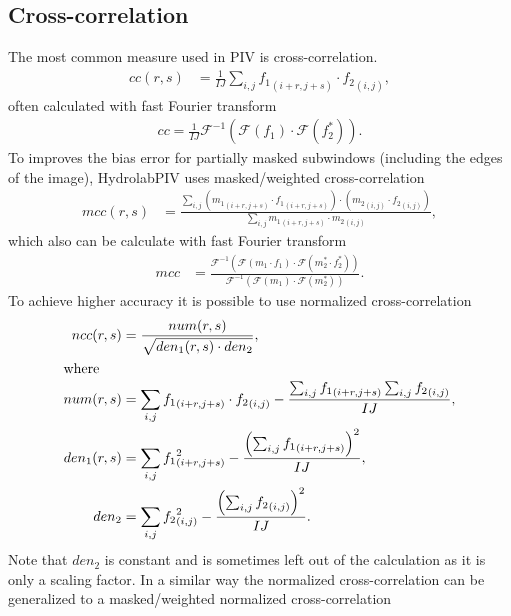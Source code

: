 \documentclass[10pt]{article}
\newcommand{\FT}{\ensuremath{\mathcal F}}
\newcommand{\iFT}{\ensuremath{\mathcal F^{-1}}}
\begin{document}
 \subsection{Cross-correlation}
 The most common measure used in PIV is cross-correlation.
   \begin{align*}	 
	 cc(r,s) &= \frac{1}{IJ}\sum_{i,j} {f_1}_{(i+r,j+s)}\cdot {f_2}_{(i,j)},
  \end{align*}
  often calculated with fast Fourier transform  
  \begin{align*}	 
	 cc = \frac{1}{IJ}\iFT\left(\FT(f_1)\cdot\FT(f_2^*)\right).
  \end{align*}    
  To improves the bias error for partially masked subwindows (including the edges of the image),
  HydrolabPIV uses masked/weighted cross-correlation  
  \begin{align*} 
	 mcc(r,s) &= \frac{\sum_{i,j} \left({m_1}_{(i+r,j+s)}\cdot {f_1}_{(i+r,j+s)}\right)
	                         \cdot\left({m_2}_{(i,j)}\cdot {f_2}_{(i,j)}\right)}
	                         {\sum_{i,j} {m_1}_{(i+r,j+s)}\cdot {m_2}_{(i,j)}},
  \end{align*}
  which also can be calculate with fast Fourier transform 
  \begin{align*} 
	 mcc &= \frac{\iFT\left(\FT(m_1\cdot f_1)\cdot\FT(m_2^*\cdot f_2^*)\right)}{\iFT\left(\FT(m_1)\cdot\FT(m_2^*)\right)}.
  \end{align*}  
To achieve higher accuracy it is possible to use normalized cross-correlation
\begin{align*}
  ncc(r,s) &= \frac{num(r,s)}{\sqrt{den_1(r,s)\cdot den_2}}, \\
\intertext{where}
	 num(r,s) &= \sum_{i,j} {f_1}_{(i+r,j+s)}\cdot {f_2}_{(i,j)}  - \frac{\sum_{i,j} {f_1}_{(i+r,j+s)}\sum_{i,j}{f_2}_{(i,j)}}{IJ}, \\
	 den_1(r,s) &= \sum_{i,j} {f_1}_{(i+r,j+s)}^2  - \frac{\left(\sum_{i,j} {f_1}_{(i+r,j+s)}\right)^2}{IJ}, \\
	 den_2 &= \sum_{i,j} {f_2}_{(i,j)}^2  - \frac{\left(\sum_{i,j} {f_2}_{(i,j)}\right)^2}{IJ}.
\end{align*}
Note that $den_2$ is constant and is sometimes left out of the calculation as it is only a scaling factor.
In a similar way the normalized cross-correlation can be
generalized to a masked/weighted normalized cross-correlation 
\end{document}
